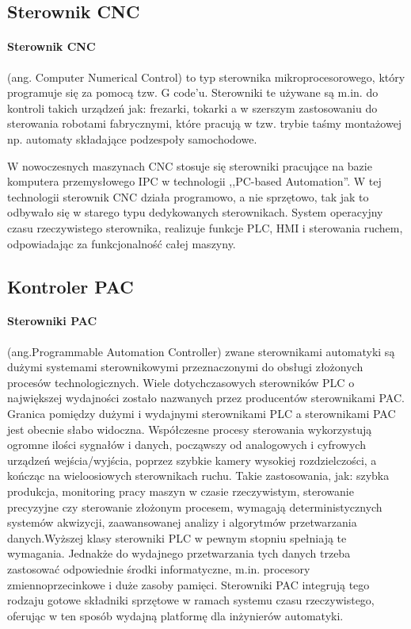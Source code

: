 \documentclass[a4paper,twoside]{report}
\begin{document}
\subsection{Sterownik CNC}
\paragraph{Sterownik CNC} (ang. Computer Numerical Control) to typ sterownika mikroprocesorowego, który programuje się za pomocą tzw. G code'u. Sterowniki te używane są m.in. do kontroli takich urządzeń jak: frezarki, tokarki a w szerszym zastosowaniu do sterowania robotami fabrycznymi, które pracują w tzw. trybie taśmy montażowej np. automaty składające podzespoły samochodowe.

W nowoczesnych maszynach CNC stosuje się sterowniki pracujące na bazie komputera przemysłowego IPC w technologii ,,PC-based Automation''. W tej technologii sterownik CNC działa programowo, a nie sprzętowo, tak jak to odbywało się w starego typu dedykowanych sterownikach. System operacyjny czasu rzeczywistego sterownika, realizuje funkcje PLC, HMI i sterowania ruchem, odpowiadając za funkcjonalność całej maszyny.

\subsection{Kontroler PAC}
\paragraph{Sterowniki PAC} (ang.Programmable Automation Controller) zwane sterownikami automatyki są dużymi systemami sterownikowymi przeznaczonymi do obsługi złożonych procesów technologicznych. Wiele dotychczasowych sterowników PLC o największej wydajności zostało nazwanych przez producentów sterownikami PAC. Granica pomiędzy dużymi i wydajnymi sterownikami PLC a sterownikami PAC jest obecnie słabo widoczna.
Współczesne procesy sterowania wykorzystują ogromne ilości sygnałów i danych, począwszy od analogowych i cyfrowych urządzeń wejścia/wyjścia, poprzez szybkie kamery wysokiej rozdzielczości, a kończąc na wieloosiowych
sterownikach ruchu. Takie zastosowania, jak: szybka produkcja, monitoring pracy maszyn w czasie rzeczywistym, sterowanie precyzyjne czy sterowanie złożonym procesem, wymagają deterministycznych systemów akwizycji, zaawansowanej analizy i algorytmów przetwarzania danych.Wyższej klasy sterowniki PLC w pewnym stopniu spełniają te wymagania. Jednakże do wydajnego przetwarzania tych danych trzeba zastosować odpowiednie środki informatyczne, m.in. procesory zmiennoprzecinkowe i duże zasoby pamięci. Sterowniki PAC integrują tego rodzaju gotowe składniki sprzętowe w ramach systemu czasu rzeczywistego, oferując w ten sposób wydajną platformę dla inżynierów automatyki.
\end{document}
